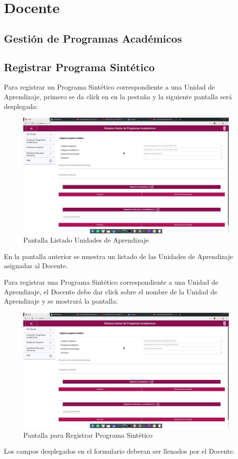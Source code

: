 \chapter{Docente}
\section{Gestión de Programas Académicos}
\section{Registrar Programa Sintético}
Para registrar un Programa Sintético correspondiente a una Unidad de Aprendizaje, primero se da click en en la pestaña  y la siguiente pantalla será desplegada:

\begin{figure}[H]
    \centering
    \hypertarget{2}{\includegraphics[width=0.5\linewidth]{images/SP6/1.jpeg}}
    \caption{Pantalla Listado Unidades de Aprendizaje}
\end{figure}

En la pantalla anterior se muestra un listado de las Unidades de Aprendizaje asignadas al Docente.

Para registrar una Programa Sintético correspondiente a una Unidad de Aprendizaje, el Docente debe dar click sobre el nombre de la Unidad de Aprendizaje y se mostrará la pantalla:

\pagebreak
\begin{figure}[H]
    \centering
    \includegraphics[width=0.5\linewidth]{images/SP6/1.jpeg}
    \caption{Pantalla para Registrar Programa Sintético}
\end{figure}

Los campos desplegados en el formulario deberan ser llenados por el Docente.

